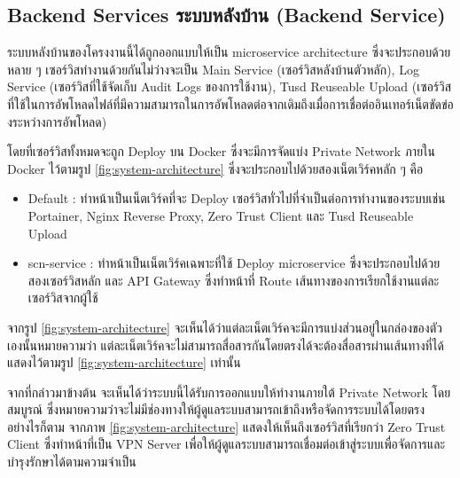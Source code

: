 \subsection{\ifenglish Backend Services \else ระบบหลังบ้าน (Backend Service) \fi}
\ifenglish \else
ระบบหลังบ้านของโครงงานนี้ได้ถูกออกแบบให้เป็น microservice architecture ซึ่งจะประกอบด้วยหลาย ๆ เซอร์วิสทำงานด้วยกันไม่ว่างจะเป็น Main Service (เซอร์วิสหลังบ้านตัวหลัก), Log Service (เซอร์วิสที่ใช้จัดเก็บ Audit Logs ของการใช้งาน), Tusd Reuseable Upload (เซอร์วิสที่ใช้ในการอัพโหลดไฟล์ที่มีความสามารถในการอัพโหลดต่อจากเดิมถึงเมื่อการเชื่อต่ออินเทอร์เน็ตขัดข่องระหว่างการอัพโหลด)

โดยที่เซอร์วิสทั้งหมดจะถูก Deploy บน Docker ซึ่งจะมีการจัดแบ่ง Private Network ภายใน Docker ไว้ตามรูป \ref{fig:system-architecture} ซึ่งจะประกอบไปด้วยสองเน็ตเวิร์คหลัก ๆ คือ
\begin{itemize}
    \item Default : ทำหน้าเป็นเน็ตเวิร์คที่จะ Deploy เซอร์วิสทั่วไปที่จำเป็นต่อการทำงานของระบบเช่น Portainer, Nginx Reverse Proxy, Zero Trust Client และ Tusd Reuseable Upload
    \item scn-service : ทำหน้าเป็นเน็ตเวิร์คเฉพาะที่ใช้ Deploy microservice ซึ่งจะประกอบไปด้วยสองเซอร์วิสหลัก และ API Gateway ซึ่งทำหน้าที่ Route เส้นทางของการเรียกใช้งานแต่ละเซอร์วิสจากผู้ใช้
\end{itemize}

จากรูป \ref{fig:system-architecture} จะเห็นได้ว่าแต่ละเน็ตเวิร์คจะมีการแบ่งส่วนอยู๋ในกล่องของตัวเองนั้นหมายความว่า แต่ละเน็ตเวิร์คจะไม่สามารถสื่อสารกันโดยตรงได้จะต้องสื่อสารผ่านเส้นทางที่ได้แสดงไว้ตามรูป \ref{fig:system-architecture} เท่านั้น

จากที่กล่าวมาข้างต้น จะเห็นได้ว่าระบบนี้ได้รับการออกแบบให้ทำงานภายใต้ Private Network โดยสมบูรณ์ ซึ่งหมายความว่าจะไม่มีช่องทางให้ผู้ดูแลระบบสามารถเข้าถึงหรือจัดการระบบได้โดยตรง อย่างไรก็ตาม จากภาพ \ref{fig:system-architecture} แสดงให้เห็นถึงเซอร์วิสที่เรียกว่า Zero Trust Client ซึ่งทำหน้าที่เป็น VPN Server เพื่อให้ผู้ดูแลระบบสามารถเชื่อมต่อเข้าสู่ระบบเพื่อจัดการและบำรุงรักษาได้ตามความจำเป็น
\fi